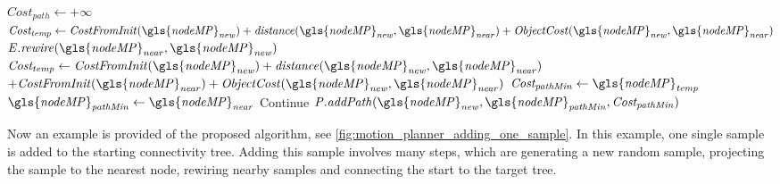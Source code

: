 \begin{algorithm}[H]
\begin{algorithmic}[1]
{{\hspace{-0.1cm}\colorbox{my_green}{\parbox{\linewidth}{%
    \State $\mathit{Cost_{path}} \leftarrow +\infty$ 
    \State $\mathit{Cost_{temp}} \leftarrow \mathit{CostFromInit(\gls{nodeMP}_{new}) + distance(\gls{nodeMP}_{new}, \gls{nodeMP}_{near}) + ObjectCost(\gls{nodeMP}_{new}, \gls{nodeMP}_{near})}$
    \State $\mathit{E.rewire(\gls{nodeMP}_{near}, \gls{nodeMP}_{new})}$
           \EndIf
        \EndIf
      \Else {}
      \State $\mathit{Cost_{temp} \leftarrow CostFromInit(\gls{nodeMP}_{new}) + distance(\gls{nodeMP}_{new}, \gls{nodeMP}_{near})} $ \newline\hspace*{10em} $+ \mathit{CostFromInit(\gls{nodeMP}_{near}) + ObjectCost(\gls{nodeMP}_{new}, \gls{nodeMP}_{near})}$
          \State $\mathit{Cost_{pathMin} \leftarrow \gls{nodeMP}_{temp}}$
          \State $\mathit{\gls{nodeMP}_{pathMin} \leftarrow \gls{nodeMP}_{near}}$
              \EndIf
          \EndIf
      \EndIf
          \State Continue
      \Else
      \State $\mathit{P.addPath(\gls{nodeMP}_{new}, \gls{nodeMP}_{pathMin}, Cost_{pathMin})}$
      \EndIf
    \EndFor
}}
\EndWhile
}}
\end{algorithmic}
\end{algorithm}

\newpage
Now an example is provided of the proposed algorithm, see \cref{fig:motion_planner_adding_one_sample}. In this example, one single sample is added to the starting connectivity tree. Adding this sample involves many steps, which are generating a new random sample, projecting the sample to the nearest node, rewiring nearby samples and connecting the start to the target tree.\bs

